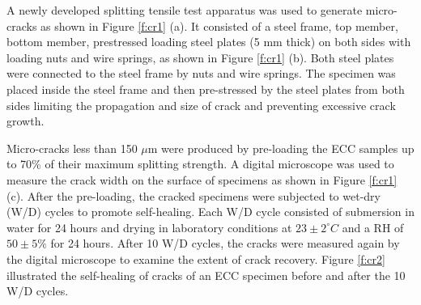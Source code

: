 \documentclass[11pt]{article}
\begin{document}
A newly developed splitting tensile test apparatus was used to generate micro-cracks as shown in Figure \ref{f:cr1} (a). It consisted of a steel frame, top member, bottom member, prestressed loading steel plates (5 mm thick) on both sides with loading nuts and wire springs, as shown in Figure \ref{f:cr1} (b). Both steel plates were connected to the steel frame by nuts and wire springs. The specimen was placed inside the steel frame and then pre-stressed by the steel plates from both sides limiting the propagation and size of crack and preventing excessive crack growth.

Micro-cracks less than 150 $\mu$m were produced by pre-loading the ECC samples up to 70\% of their maximum splitting strength. A digital microscope was used to measure the crack width on the surface of specimens as shown in Figure \ref{f:cr1} (c). After the pre-loading, the cracked specimens were subjected to wet-dry (W/D) cycles to promote self-healing. Each W/D cycle consisted of submersion in water  for 24 hours and drying in laboratory conditions at $23 \pm 2^\circ C$ and a RH of $50 \pm 5\%$ for 24 hours. After 10 W/D cycles, the cracks were measured again by the digital microscope to examine the extent of crack recovery. Figure \ref{f:cr2} illustrated the self-healing of cracks of an ECC specimen before and after the 10 W/D cycles.
\end{document}
